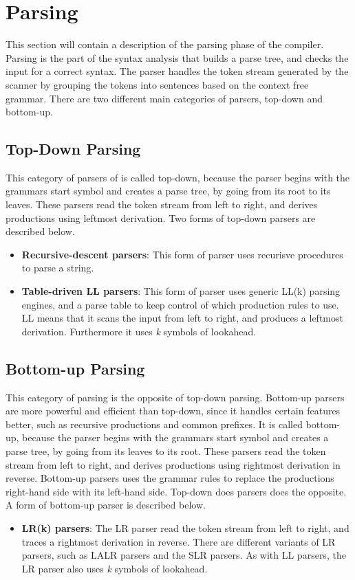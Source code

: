 \section{Parsing}
This section will contain a description of the parsing phase of the compiler. 
\\Parsing is the part of the syntax analysis that builds a parse tree, and checks the input for a correct syntax. The parser handles the token stream generated by the scanner by grouping the tokens into sentences based on the context free grammar. There are two different main categories of parsers, top-down and bottom-up.

\subsection{Top-Down Parsing}
This category of parsers of is called top-down, because the parser begins with the grammars start symbol and creates a parse tree, by going from its root to its leaves. These parsers read the token stream from left to right, and derives productions using leftmost derivation. Two forms of top-down parsers are described below. 

\begin{itemize}
\item \textbf{Recursive-descent parsers}: This form of parser uses recurisve procedures to parse a string. 
\item \textbf{Table-driven LL parsers}: This form of parser uses generic LL(k) parsing engines, and a parse table to keep control of which production rules to use. LL means that it scans the input from left to right, and produces a leftmost derivation. Furthermore it uses \textit{k} symbols of lookahead. 
\end{itemize}

\subsection{Bottom-up Parsing}
This category of parsing is the opposite of top-down parsing. Bottom-up parsers are more powerful and efficient than top-down, since it handles certain features better, such as recursive productions and common prefixes. It is called bottom-up, because the parser begins with the grammars start symbol and creates a parse tree, by going from its leaves to its root. These parsers read the token stream from left to right, and derives productions using rightmost derivation in reverse. Bottom-up parsers uses the grammar rules to replace the productions right-hand side with its left-hand side. Top-down does parsers does the opposite. A form of bottom-up parser is described below. 

\begin{itemize}
\item \textbf{LR(k) parsers}: The LR parser read the token stream from left to right, and traces a rightmost derivation in reverse. There are different variants of LR parsers, such as LALR parsers and the SLR parsers. As with LL parsers, the LR parser also uses \textit{k} symbols of lookahead.  
\end{itemize}
